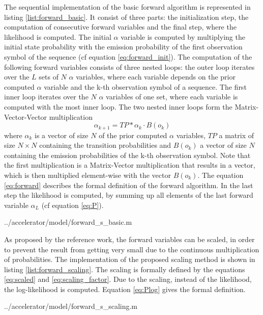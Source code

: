 \documentclass[mscthesis]{usiinfthesis}
\begin{document}
The sequential implementation of the basic forward algorithm is represented in
listing \ref{list:forward_basic}. It consist of three parts: the initialization
step, the computation of consecutive forward variables and the final step,
where the likelihood is computed. The initial $ \alpha $ variable is computed
by multiplying the initial state probability with the emission probability of
the first observation symbol of the sequence (cf equation
\ref{eq:forward_init}). The computation of the following forward variables
consists of three nested loops: the outer loop iterates over the $ L $ sets of
$ N $ $ \alpha $ variables, where each variable depends on the prior computed
$ \alpha $ variable and the k-th observation symbol of a sequence. The first
inner loop iterates over the $ N $ $ \alpha $ variables of one set, where each
variable is computed with the most inner loop. The two nested inner loops form
the Matrix-Vector-Vector multiplication
\begin{equation}
    \label{eq:mvv}
    \alpha_{k+1} = TP * \alpha_k \cdot B(o_k)
\end{equation}
where $ \alpha_k $ is a vector of size $ N $ of the prior computed $ \alpha
$ variables, $ TP $ a matrix of size $ N \times N $ containing the transition
probabilities and $ B(o_k) $ a vector of size $ N $ containing the emission
probabilities of the k-th observation symbol. Note that the first
multiplication is a Matrix-Vector multiplication that results in a vector,
which is then multiplied element-wise with the vector $ B(o_k) $. The equation
\ref{eq:forward} describes the formal definition of the forward algorithm. In
the last step the likelihood is computed, by summing up all elements of the
last forward variable $ \alpha_L $ (cf equation \ref{eq:P}).


    {../accelerator/model/forward_s_basic.m}

As proposed by the reference work, the forward variables can be scaled, in
order to prevent the result from getting very small due to the continuous
multiplication of probabilities. The implementation of the proposed scaling
method is shown in listing \ref{list:forward_scaling}. The scaling is formally
defined by the equations \ref{eq:scaled} and \ref{eq:scaling_factor}. Due to the
scaling, instead of the likelihood, the log-likelihood is computed. Equation
\ref{eq:Plog} gives the formal definition.


    {../accelerator/model/forward_s_scaling.m}
\end{document}
